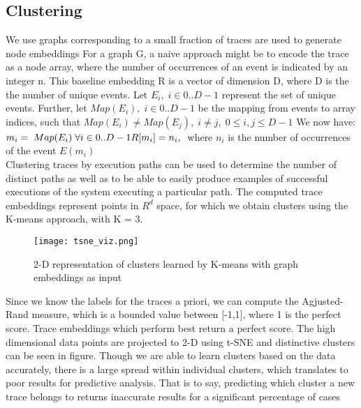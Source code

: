 \subsection{Clustering}
 We use graphs corresponding to a small fraction of traces are used to generate node embeddings
For a graph G, a naive approach might be to encode the trace as a node array, where the number of occurrences of an event is indicated by an integer n. This baseline embedding R is a vector of dimension D, where D is the the number of unique events. 
Let $E_{i},\; i \in {0..D-1} $ represent the set of unique events. Further, let $Map(E_{i}),\; i \in {0..D-1} $ be the mapping from events to array indices, such that $ Map(E_{i}) \neq Map(E_{j}),\;  i \neq j,\; 0 \leq i,j \leq D-1 $ We now have: \newline
\begin{math}
m_{i} =\; Map(E_{i})\; \forall i \in {0..D-1} \\
R[m_{i}] = n_{i},\;  
\end{math}
where $n_{i}$ is the number of occurrences of the event $ E(m_{i})$\\ 
 Clustering traces by execution paths can be used to determine the number of distinct paths as well as to be able to easily produce examples of successful executions of the system executing a particular path. The computed trace embeddings represent points in $R^{d}$ space, for which we obtain clusters using the K-means approach, with K = 3. 
 
 
 \begin{figure}
\texttt{[image: tsne\_viz.png]}
\caption{2-D representation of clusters learned by K-means with graph embeddings as input}
\label{Clusters}
\end{figure}
 
Since we know the labels for the traces a priori, we can compute the Agjusted-Rand measure, which is a bounded value between [-1,1], where 1 is the perfect score.  Trace embeddings which perform best return a perfect score. The high dimensional data points are projected to 2-D using t-SNE and distinctive clusters can be seen in figure. Though we are able to learn clusters based on the data accurately, there is a large spread within individual clusters, which translates to poor results for predictive analysis. That is to say, predicting which cluster a new trace belongs to returns inaccurate results for a significant percentage of cases

